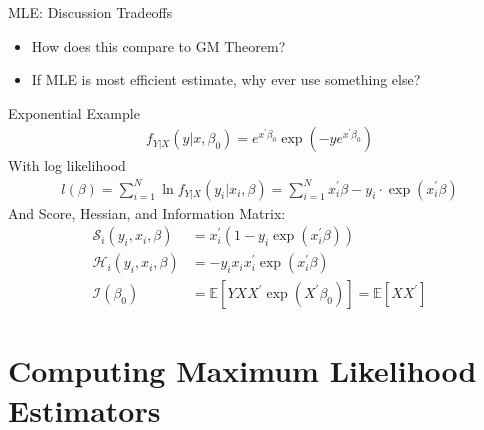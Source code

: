 \documentclass[aspectratio=169]{beamer}
\begin{document}
\begin{frame}{MLE: Discussion}
Tradeoffs
\begin{itemize}
\item How does this compare to GM Theorem?
\item If MLE is most efficient estimate, why ever use something else?
\end{itemize}
\end{frame}


\begin{frame}{Exponential Example}
\begin{align*}
f _ { Y | X } ( y | x , \beta _ { 0 } ) =  { e } ^ { x ^ { \prime } \beta _ { 0 } } \exp \left( - y  { e } ^ { x ^ { \prime } \beta _ { 0 } } \right)
\end{align*}
With log likelihood
\begin{align*}
l( \beta ) = \sum _ { i = 1 } ^ { N } \ln f _ { Y | X } \left( y _ { i } | x _ { i } , \beta \right) = \sum _ { i = 1 } ^ { N } x _ { i } ^ { \prime } \beta - y _ { i } \cdot \exp \left( x _ { i } ^ { \prime } \beta \right)
\end{align*}
And Score, Hessian, and Information Matrix:
\begin{align*}
\mathcal { S }_i ( y_i, x_i , \beta ) &= x_i ^ { \prime } \left( 1 - y_i \exp \left( x_i ^ { \prime } \beta \right) \right)\\
\mathcal { H }_i ( y_i , x_i , \beta ) &= - y_i x_i x_i ^ { \prime } \exp \left( x_i ^ { \prime } \beta \right)\\
\mathcal { I } \left( \beta _ { 0 } \right) &= \mathbb { E } \left[ Y X X ^ { \prime } \exp \left( X ^ { \prime } \beta _ { 0 } \right) \right] = \mathbb { E } \left[ X X ^ { \prime } \right]
\end{align*}
\end{frame}


\section*{Computing Maximum Likelihood Estimators}
\end{document}
